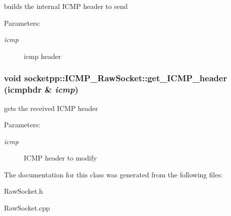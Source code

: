 builds the internal ICMP header to send 

\begin{Desc}
\item[Parameters:]
\begin{description}
\item[{\em icmp}]icmp header \end{description}
\end{Desc}
\hypertarget{classsocketpp_1_1ICMP__RawSocket_9b0ed9bb87d2895f2302db13b7ca5f06}{
\subsubsection[{get\_\-ICMP\_\-header}]{\setlength{\rightskip}{0pt plus 5cm}void socketpp::ICMP\_\-RawSocket::get\_\-ICMP\_\-header (icmphdr \& {\em icmp})}}
\label{classsocketpp_1_1ICMP__RawSocket_9b0ed9bb87d2895f2302db13b7ca5f06}


gets the received ICMP header 

\begin{Desc}
\item[Parameters:]
\begin{description}
\item[{\em icmp}]ICMP header to modify \end{description}
\end{Desc}


The documentation for this class was generated from the following files:\begin{CompactItemize}
\item 
RawSocket.h\item 
RawSocket.cpp\end{CompactItemize}
